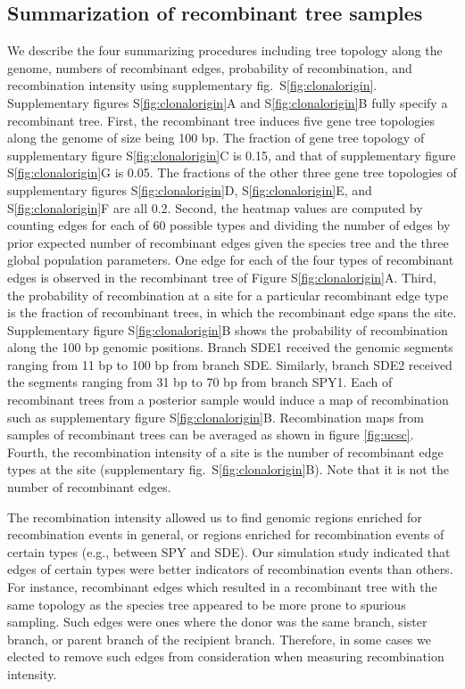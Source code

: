 \documentclass[12pt]{article}
\begin{document}
\subsection*{Summarization of recombinant tree samples}
We describe the four summarizing procedures including tree topology along the
genome, numbers of recombinant edges, probability of recombination, and
recombination intensity using supplementary fig.\ S\ref{fig:clonalorigin}.  
Supplementary figures S\ref{fig:clonalorigin}A 
and S\ref{fig:clonalorigin}B fully specify a
recombinant tree.  First, the recombinant tree induces  five gene tree
topologies along the genome of size being 100 bp. The fraction of gene tree
topology of supplementary figure S\ref{fig:clonalorigin}C is 0.15, and 
that of supplementary figure S\ref{fig:clonalorigin}G is 0.05. 
The fractions of the other three gene tree
topologies of 
supplementary figures S\ref{fig:clonalorigin}D, S\ref{fig:clonalorigin}E, 
and S\ref{fig:clonalorigin}F are all 0.2.  Second, the heatmap values are computed
by counting edges for each of 60 possible types and dividing the number of edges
by prior expected number of recombinant edges given the species tree and the
three global population parameters.  One edge for each of the four types of
recombinant edges is observed in the recombinant tree of Figure
S\ref{fig:clonalorigin}A.  Third, the probability of recombination at a site for
a particular recombinant edge type is the fraction of recombinant trees, in
which the recombinant edge spans the site.  
Supplementary figure S\ref{fig:clonalorigin}B
shows the probability of recombination along the 100 bp genomic positions.
Branch SDE1 received the genomic segments ranging from 11 bp to 100 bp from
branch SDE.  Similarly, branch SDE2 received the segments ranging from 31 bp to
70 bp from branch SPY1.  Each of recombinant trees from a posterior sample would
induce a map of recombination such as 
supplementary figure S\ref{fig:clonalorigin}B.
Recombination maps from samples of recombinant trees can be averaged as shown in
figure \ref{fig:ucsc}.  
Fourth, the recombination intensity of a site is the
number of recombinant edge types at the site 
(supplementary fig.\ S\ref{fig:clonalorigin}B).
Note that it is not the number of recombinant edges.  



The recombination intensity allowed us to find genomic regions enriched for
recombination events in general, or regions enriched for recombination events of
certain types (e.g., between SPY and SDE).  
Our simulation study indicated that edges of
certain types were better indicators of recombination events than others.  For
instance, recombinant edges which resulted in a recombinant tree with the same
topology as the species tree appeared to be more prone to spurious sampling.
Such edges were ones where the donor was the same branch, sister branch, or
parent branch of the recipient branch.  Therefore, in some cases we elected to
remove such edges from consideration when measuring recombination intensity.  
\end{document}
